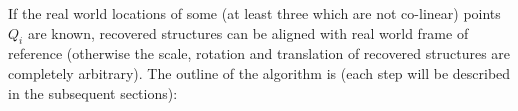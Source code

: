 \documentclass[12pt]{article}
\begin{document}

If the real world locations of some (at least three which are not co-linear)
points $Q_i$ are known, recovered structures can be aligned with real world
frame of reference (otherwise the scale, rotation and translation of recovered
structures are completely arbitrary). The outline of the algorithm is (each step will be described in the subsequent sections):
\end{document}
